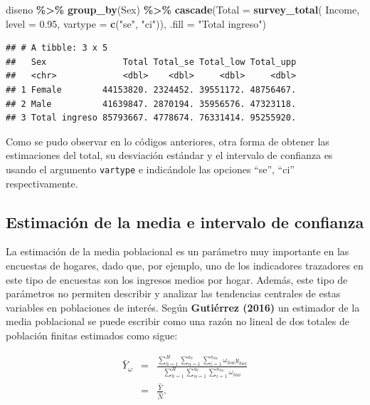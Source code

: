 \documentclass[
  12pt,
]{book}
\newenvironment{Shaded}{\begin{snugshade}}{\end{snugshade}}
\newcommand{\AttributeTok}[1]{\textcolor[rgb]{0.13,0.29,0.53}{#1}}
\newcommand{\FloatTok}[1]{\textcolor[rgb]{0.00,0.00,0.81}{#1}}
\newcommand{\FunctionTok}[1]{\textcolor[rgb]{0.13,0.29,0.53}{\textbf{#1}}}
\newcommand{\NormalTok}[1]{#1}
\newcommand{\SpecialCharTok}[1]{\textcolor[rgb]{0.81,0.36,0.00}{\textbf{#1}}}
\newcommand{\StringTok}[1]{\textcolor[rgb]{0.31,0.60,0.02}{#1}}
\begin{document}
\begin{Shaded}
\begin{Highlighting}[]
\NormalTok{diseno }\SpecialCharTok{\%\textgreater{}\%} \FunctionTok{group\_by}\NormalTok{(Sex) }\SpecialCharTok{\%\textgreater{}\%}
  \FunctionTok{cascade}\NormalTok{(}\AttributeTok{Total =} \FunctionTok{survey\_total}\NormalTok{(}
\NormalTok{    Income, }\AttributeTok{level =} \FloatTok{0.95}\NormalTok{,}
    \AttributeTok{vartype =}  \FunctionTok{c}\NormalTok{(}\StringTok{"se"}\NormalTok{, }\StringTok{"ci"}\NormalTok{)),}
          \AttributeTok{.fill =} \StringTok{"Total ingreso"}\NormalTok{)}
\end{Highlighting}
\end{Shaded}

\begin{verbatim}
## # A tibble: 3 x 5
##   Sex               Total Total_se Total_low Total_upp
##   <chr>             <dbl>    <dbl>     <dbl>     <dbl>
## 1 Female        44153820. 2324452. 39551172. 48756467.
## 2 Male          41639847. 2870194. 35956576. 47323118.
## 3 Total ingreso 85793667. 4778674. 76331414. 95255920.
\end{verbatim}

Como se pudo observar en lo códigos anteriores, otra forma de obtener las estimaciones del total, su desviación estándar y el intervalo de confianza es usando el argumento \texttt{vartype} e indicándole las opciones ``se'', ``ci'' respectivamente.

\subsection{Estimación de la media e intervalo de confianza}\label{estimaciuxf3n-de-la-media-e-intervalo-de-confianza}

La estimación de la media poblacional es un parámetro muy importante en las encuestas de hogares, dado que, por ejemplo, uno de los indicadores trazadores en este tipo de encuestas son los ingresos medios por hogar. Además, este tipo de parámetros no permiten describir y analizar las tendencias centrales de estas variables en poblaciones de interés. Según \textbf{Gutiérrez (2016)} un estimador de la media poblacional se puede escribir como una razón no lineal de dos totales de población finitas estimados como sigue:

\begin{eqnarray*}
\bar{Y}_{\omega} & = & \frac{\sum_{h=1}^{H}\sum_{\alpha=1}^{a_{h}}\sum_{i=1}^{n_{h\alpha}}\omega_{h\alpha i}y_{h\alpha i}}{\sum_{h=1}^{H}\sum_{\alpha=1}^{a_{h}}\sum_{i=1}^{n_{h\alpha}}\omega_{h\alpha i}}\\
 & = & \frac{\hat{Y}}{\hat{N}}.
\end{eqnarray*}
\end{document}
